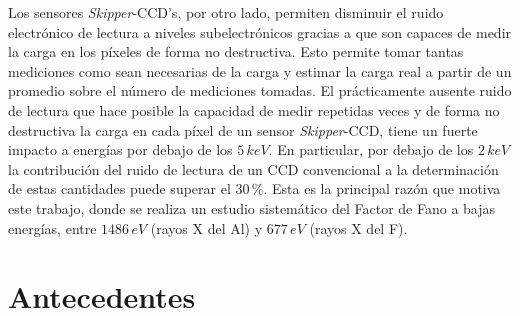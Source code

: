 Los sensores \textit{Skipper}-CCD's, por otro lado, permiten disminuir el ruido electrónico de lectura a niveles subelectrónicos gracias a que son capaces de medir la carga en los píxeles de forma no destructiva. Esto permite tomar tantas mediciones como sean necesarias de la carga y estimar la carga real a partir de un promedio sobre el número de mediciones tomadas. El prácticamente ausente ruido de lectura que hace posible la capacidad de medir repetidas veces y de forma no destructiva la carga en cada píxel de un sensor \textit{Skipper}-CCD, tiene un fuerte impacto a energías por debajo de los $5\,\si{keV}$. En particular, por debajo de los $2\,\si{keV}$ la contribución del ruido de lectura de un CCD convencional a la determinación de estas cantidades puede superar el $30\,\%$. 
Esta es la principal razón que motiva este trabajo, donde se realiza un estudio sistemático del Factor de Fano a bajas energías, entre $1486\,\si{eV}$ (rayos X del Al) y $677\,\si{eV}$ (rayos X del F).\\


\section{Antecedentes}


